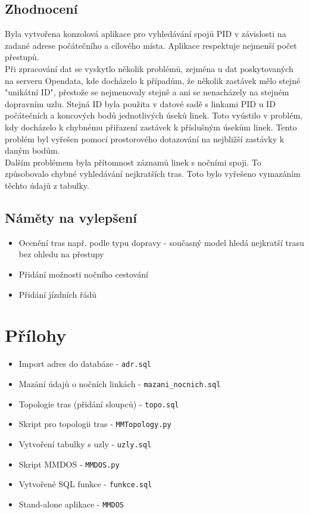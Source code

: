 \documentclass[a4paper, 12pt]{article}
\begin{document}
\subsection{Zhodnocení}
Byla vytvořena konzolová aplikace pro vyhledávání spojů PID v závislosti na zadané adrese počátečního a cílového místa. Aplikace respektuje nejmenší počet přestupů. \\
Při zpracování dat se vyskytlo několik problémů, zejména u dat poskytovaných na serveru Opendata, kde docházelo k případům, že několik zastávek mělo stejné "unikátní ID", přestože se nejmenovaly stejně a ani se nenacházely na stejném dopravním uzlu. Stejná ID byla použita v datové sadě s linkami PID u ID počátečních a koncových bodů jednotlivých úseků linek. Toto vyústilo v problém, kdy docházelo k chybnému přiřazení zastávek k příslušným úsekům linek. Tento problém byl vyřešen pomocí prostorového dotazování na nejbližší zastávky k daným bodům. \\
Dalším problémem byla přítomnost záznamů linek s nočními spoji. To způsobovalo chybné vyhledávání nejkratších tras. Toto bylo vyřešeno vymazáním těchto údajů z tabulky. \\

\subsection{Náměty na vylepšení}
\begin{itemize}
	\item Ocenění tras např. podle typu dopravy - současný model hledá nejkratší trasu bez ohledu na přestupy
	\item Přidání možnosti nočního cestování
	\item Přidání jízdních řádů
\end{itemize}

\newpage
\section{Přílohy}
\begin{itemize}
	\item Import adres do databáze - \texttt{adr.sql}
	\item Mazání údajů o nočních linkách - \texttt{mazani\_nocnich.sql}
	\item Topologie tras (přidání sloupců) - \texttt{topo.sql}
	\item Skript pro topologii tras - \texttt{MMTopology.py}
	\item Vytvoření tabulky s uzly - \texttt{uzly.sql}
	\item Skript MMDOS - \texttt{MMDOS.py}
	\item Vytvořené SQL funkce - \texttt{funkce.sql}
	\item Stand-alone aplikace - \texttt{MMDOS}
\end{itemize}
\end{document}
